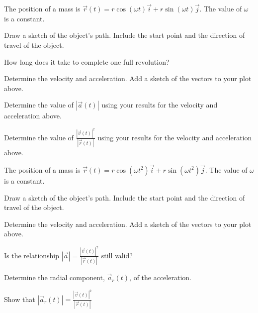 \begin{problem}
%

\item The position of a mass is
  $\vec{r}(t)=r\cos(\omega t)\vec{i}+r\sin(\omega t)\vec{j}$. The
  value of $\omega$ is a constant.
  \begin{subproblem}
  \item Draw a sketch of the object's path. Include the start point
    and the direction of travel of the object.
    \vfill
  \item How long does it take to complete one full revolution?
    \vspace{3em}
  \item Determine the velocity and acceleration. Add a sketch of the
    vectors to your plot above.
    \vfill
    \clearpage
  \item Determine the value of $|\vec{a}(t)|$ using your results for
    the velocity and acceleration above.
    \vfill
  \item Determine the value of $\frac{|\vec{v}(t)|^2}{|\vec{r}(t)|}$
    using your results for the velocity and acceleration above.
    \vfill
  \end{subproblem}

\end{problem}

\begin{problem}
\item The position of a mass is
  $\vec{r}(t)=r\cos(\omega t^2)\vec{i}+r\sin(\omega t^2)\vec{j}$. The
  value of $\omega$ is a constant.
  \begin{subproblem}
  \item Draw a sketch of the object's path. Include the start point
    and the direction of travel of the object.
    \vfill
  \item Determine the velocity and acceleration. Add a sketch of the
    vectors to your plot above.
    \vfill
    \clearpage
  \item Is the relationship $|\vec{a}|=\frac{|\vec{v}(t)|^2}{|\vec{r}(t)|}$
    still valid?
    \vfill
  \item Determine the radial component, $\vec{a}_r(t)$, of the
    acceleration.
    \vfill
  \item Show that $|\vec{a}_r(t)| = \frac{|\vec{v}(t)|^2}{|\vec{r}(t)|}$
    \vfill
  \end{subproblem}
\end{problem}

